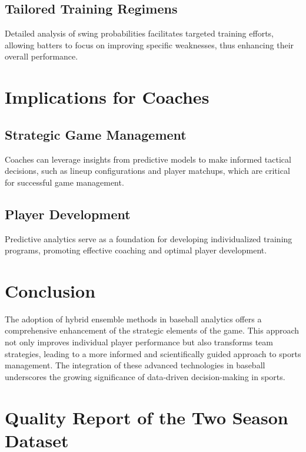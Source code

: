 \documentclass[12pt]{article}
\begin{document}
\subsection*{Tailored Training Regimens}
Detailed analysis of swing probabilities facilitates targeted training efforts, allowing batters to focus on improving specific weaknesses, thus enhancing their overall performance.

\section*{Implications for Coaches}
\subsection*{Strategic Game Management}
Coaches can leverage insights from predictive models to make informed tactical decisions, such as lineup configurations and player matchups, which are critical for successful game management.
\subsection*{Player Development}
Predictive analytics serve as a foundation for developing individualized training programs, promoting effective coaching and optimal player development.

\section*{Conclusion}
The adoption of hybrid ensemble methods in baseball analytics offers a comprehensive enhancement of the strategic elements of the game. This approach not only improves individual player performance but also transforms team strategies, leading to a more informed and scientifically guided approach to sports management. The integration of these advanced technologies in baseball underscores the growing significance of data-driven decision-making in sports.
\newpage

\nocite{*}  %


\printbibliography

\newpage


\section*{Quality Report of the Two Season Dataset}
\end{document}
